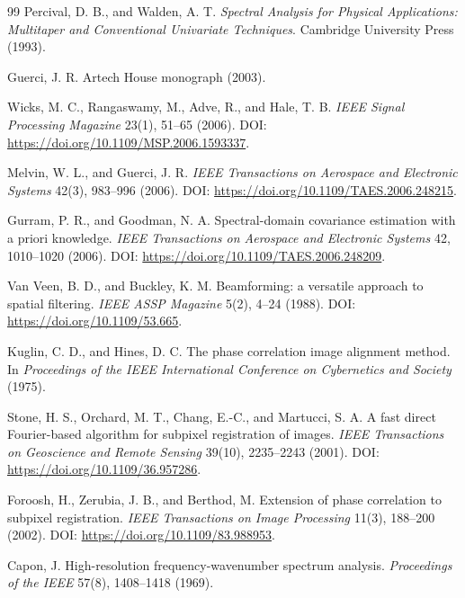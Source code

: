 \documentclass[11pt]{article}
\begin{document}
\begin{thebibliography}{99}
Percival, D. B., and Walden, A. T.
\newblock \emph{Spectral Analysis for Physical Applications: Multitaper and Conventional Univariate Techniques}.
\newblock Cambridge University Press (1993).

Guerci, J. R.
\newblock Artech House monograph (2003).

Wicks, M. C., Rangaswamy, M., Adve, R., and Hale, T. B.
\newblock \emph{IEEE Signal Processing Magazine} 23(1), 51--65 (2006).
\newblock DOI: \url{https://doi.org/10.1109/MSP.2006.1593337}.

Melvin, W. L., and Guerci, J. R.
\newblock \emph{IEEE Transactions on Aerospace and Electronic Systems} 42(3), 983--996 (2006).
\newblock DOI: \url{https://doi.org/10.1109/TAES.2006.248215}.

Gurram, P. R., and Goodman, N. A.
\newblock Spectral-domain covariance estimation with a priori knowledge.
\newblock \emph{IEEE Transactions on Aerospace and Electronic Systems} 42, 1010--1020 (2006).
\newblock DOI: \url{https://doi.org/10.1109/TAES.2006.248209}.

Van Veen, B. D., and Buckley, K. M.
\newblock Beamforming: a versatile approach to spatial filtering.
\newblock \emph{IEEE ASSP Magazine} 5(2), 4--24 (1988).
\newblock DOI: \url{https://doi.org/10.1109/53.665}.

Kuglin, C. D., and Hines, D. C.
\newblock The phase correlation image alignment method.
\newblock In \emph{Proceedings of the IEEE International Conference on Cybernetics and Society} (1975).

Stone, H. S., Orchard, M. T., Chang, E.-C., and Martucci, S. A.
\newblock A fast direct Fourier-based algorithm for subpixel registration of images.
\newblock \emph{IEEE Transactions on Geoscience and Remote Sensing} 39(10), 2235--2243 (2001).
\newblock DOI: \url{https://doi.org/10.1109/36.957286}.

Foroosh, H., Zerubia, J. B., and Berthod, M.
\newblock Extension of phase correlation to subpixel registration.
\newblock \emph{IEEE Transactions on Image Processing} 11(3), 188--200 (2002).
\newblock DOI: \url{https://doi.org/10.1109/83.988953}.

Capon, J.
\newblock High-resolution frequency-wavenumber spectrum analysis.
\newblock \emph{Proceedings of the IEEE} 57(8), 1408--1418 (1969).


\end{thebibliography}
\end{document}
